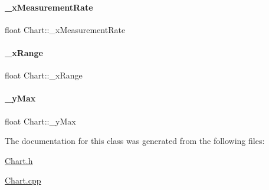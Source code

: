 \paragraph{\texorpdfstring{\+\_\+x\+Measurement\+Rate}{\_xMeasurementRate}}
{\footnotesize\ttfamily float Chart\+::\+\_\+x\+Measurement\+Rate\hspace{0.3cm}{\ttfamily [private]}}

\mbox{\label{classChart_a714191d2fc69d06d66872bba187d144b}} 
\paragraph{\texorpdfstring{\+\_\+x\+Range}{\_xRange}}
{\footnotesize\ttfamily float Chart\+::\+\_\+x\+Range\hspace{0.3cm}{\ttfamily [private]}}

\mbox{\label{classChart_aeac5778c508d702f8deb07cbb7b2c867}} 
\paragraph{\texorpdfstring{\+\_\+y\+Max}{\_yMax}}
{\footnotesize\ttfamily float Chart\+::\+\_\+y\+Max\hspace{0.3cm}{\ttfamily [private]}}



The documentation for this class was generated from the following files\+:\begin{DoxyCompactItemize}
\item 
\hyperlink{Chart_8h}{Chart.\+h}\item 
\hyperlink{Chart_8cpp}{Chart.\+cpp}\end{DoxyCompactItemize}
